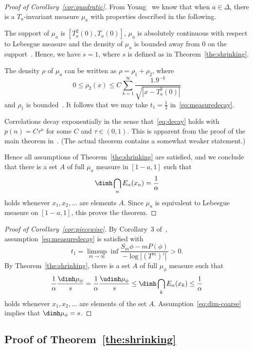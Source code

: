 \begin{proof}[Proof of Corollary~\ref{cor:quadratic}]
From Young~\cite{young} we know that when $a \in \Delta$, there is a $T_a$-invariant measure $\mu_a$ with properties described in the following.

The support of $\mu_a$ is $[T_a^2 (0), T_a (0)]$, $\mu_a$ is absolutely continuous with respect to Lebesgue measure and the density of $\mu_a$ is bounded away from $0$ on the support~\cite[Theorem~2]{young}. Hence, we have $s=1$, where $s$ is defined as in Theorem~\ref{the:shrinking}.

The density $\rho$ of $\mu_a$ can be written as $\rho = \rho_1 +
\rho_2$, where
\[
0 \leq \rho_2 (x) \leq C \sum_{k=1}^\infty \frac{1.9^{-k}}{\sqrt{|x - T_a^k (0)|}}
\]
and $\rho_1$ is bounded~\cite[Theorem~1]{young}. It follows that we may take $t_1 = \frac{1}{2}$ in~\eqref{eq:measuredecay}.

Correlations decay exponentially in the sense that~\eqref{eq:decay} holds with $p(n) = C \tau^n$ for some $C$ and $\tau \in (0,1)$. This is apparent from the proof of the main theorem in~\cite{young}. (The actual theorem contains a somewhat weaker statement.)

Hence all assumptions of Theorem~\ref{the:shrinking} are satisfied, and we conclude that there is a set $A$ of full $\mu_a$ measure in $[1-a,1]$ such that
\[
\dimh \bigcap_n E_\alpha (x_n) = \frac{1}{\alpha}
\]
holds whenever $x_1, x_2, \ldots$ are elements $A$. Since $\mu_a$ is equivalent to Lebesgue measure on $[1-a,1]$, this proves the theorem.
\end{proof}

\begin{proof}[Proof of Corollary~\ref{cor:piecewise}]
By Corollary~3 of~\cite{perssonrams}, assumption~\eqref{eq:measuredecay} is satisfied with
\[
t_1 = \limsup_{m\to \infty} \inf \frac{S_m \phi - m P(\phi)}{- \log |(T^m)'|} > 0.
\]
By Theorem~\ref{the:shrinking}, there is a set $A$ of full $\mu_\phi$ measure such that
\[
\frac{1}{\alpha} \frac{\dimh \mu_\phi}{s} = \frac{1}{\alpha}
\frac{\udimh \mu_\phi}{s} \leq \dimh \bigcap_k E_\alpha (x_k) \leq
\frac{1}{\alpha}
\]
holds whenever $x_1, x_2, \ldots$ are elements of the set $A$. Assumption~\eqref{eq:dim-coarse} implies that $\dimh \mu_\phi = s$.
\end{proof}


\subsection{Proof of Theorem~\ref{the:shrinking}}

